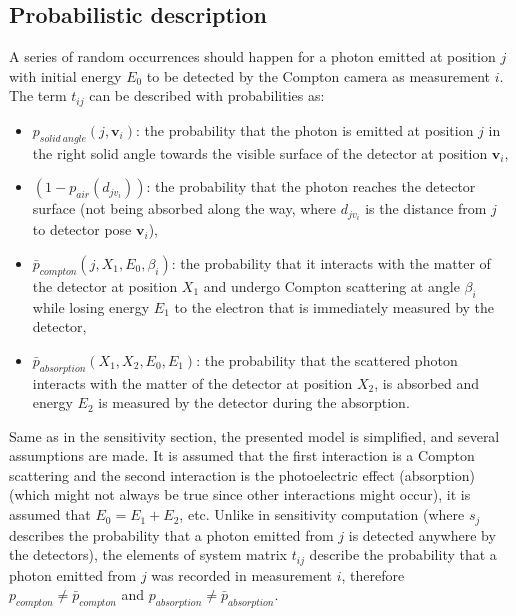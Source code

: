 \subsection{Probabilistic description}
A series of random occurrences should happen for a photon emitted at position $j$ with initial energy $E_{0}$ to be detected by the Compton camera as measurement $i$.
The term $t_{ij}$ can be described with probabilities as:
\begin{itemize}
  \item $p_{solid\ angle}(j, \mathbf{v}_{i}) $: the probability that the photon is emitted at position $j$ in the right solid angle towards the visible surface of the detector at position $\mathbf{v}_{i}$,
  \item $(1-p_{air}(d_{jv_{i}}))$: the probability that the photon reaches the detector surface (not being absorbed along the way, where $d_{jv_{i}}$ is the distance from $j$ to detector pose $\mathbf{v}_{i}$),
  \item $\bar{p}_{compton}(j, X_{1}, E_{0}, \beta_{i})$: the probability that it interacts with the matter of the detector at position $X_{1}$ and undergo Compton scattering at angle $\beta_{i}$ while losing energy $E_{1}$ to the electron that is immediately measured by the detector,
  \item $\bar{p}_{absorption}(X_{1}, X_{2}, E_{0}, E_{1})$: the probability that the scattered photon interacts with the matter of the detector at position $X_{2}$, is absorbed and energy $E_{2}$ is measured by the detector during the absorption.
\end{itemize}
Same as in the sensitivity section, the presented model is simplified, and several assumptions are made. 
It is assumed that the first interaction is a Compton scattering and the second interaction is the photoelectric effect (absorption) (which might not always be true since other interactions might occur), it is assumed that $E_{0} = E_{1} + E_{2}$, etc.
Unlike in sensitivity computation (where $s_{j}$ describes the probability that a photon emitted from $j$ is detected anywhere by the detectors), the elements of system matrix $t_{ij}$ describe the probability that a photon emitted from $j$ was recorded in measurement $i$, therefore $p_{compton}\neq \bar{p}_{compton}$ and  $p_{absorption}\neq \bar{p}_{absorption}$.


